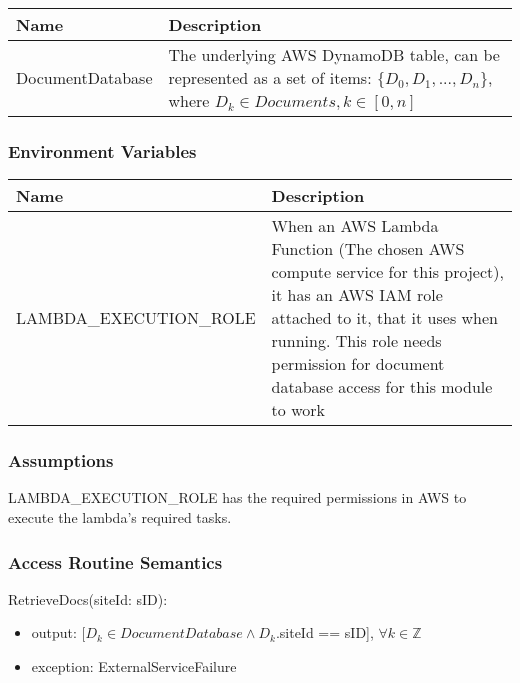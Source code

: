 \documentclass[12pt, titlepage]{article}
\begin{document}
  \begin{center}
    \begin{tabular}{p{4cm} p{12cm}}
      \hline
      \textbf{Name} & \textbf{Description} \\
      \hline
      DocumentDatabase & The underlying AWS DynamoDB table, can be
      represented as a set of items: $\{D_0, D_1, ..., D_n\}$, where
      $D_k \in Documents, k\in[0,n]$ \\
      \hline
    \end{tabular}
  \end{center}

  \subsubsection{Environment Variables}

  \begin{center}
    \begin{tabular}{p{6cm} p{10cm}}
      \hline
      \textbf{Name} & \textbf{Description} \\
      \hline
      LAMBDA\_EXECUTION\_ROLE & When an AWS Lambda Function (The chosen
      AWS compute service for this project), it has an AWS IAM role
      attached to it, that it uses when running. This role needs
      permission for document database access for this module to work \\
      \hline
    \end{tabular}
  \end{center}

  \subsubsection{Assumptions}

  LAMBDA\_EXECUTION\_ROLE has the required permissions in AWS to
  execute the lambda's required tasks.

  \subsubsection{Access Routine Semantics}

  \noindent RetrieveDocs(siteId: sID):
  \begin{itemize}
    \item output: $[D_{k} \in DocumentDatabase \land D_{k}$.siteId ==
      sID], $\forall
      k \in \mathbb{Z}$
    \item exception: ExternalServiceFailure
  \end{itemize}
\end{document}
